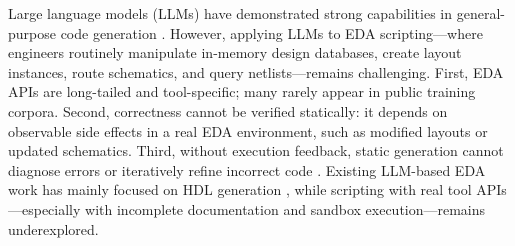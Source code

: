 \documentclass[anonymous, sigconf]{acmart}
\begin{document}
Large language models (LLMs) have demonstrated strong capabilities in general-purpose code generation \cite{vaswani2017attention, openai2023gpt4, yang2025qwen3}. However, applying LLMs to EDA scripting—where engineers routinely manipulate in-memory design databases, create layout instances, route schematics, and query netlists—remains challenging. First, EDA APIs are long-tailed and tool-specific; many rarely appear in public training corpora. Second, correctness cannot be verified statically: it depends on observable side effects in a real EDA environment, such as modified layouts or updated schematics. Third, without execution feedback, static generation cannot diagnose errors or iteratively refine incorrect code \cite{chen2024dawning, blocklove2024eda}. Existing LLM-based EDA work has mainly focused on HDL generation \cite{thakur2023verigen, liu2023rtlcoder}, while scripting with real tool APIs—especially with incomplete documentation and sandbox execution—remains underexplored.
\end{document}
